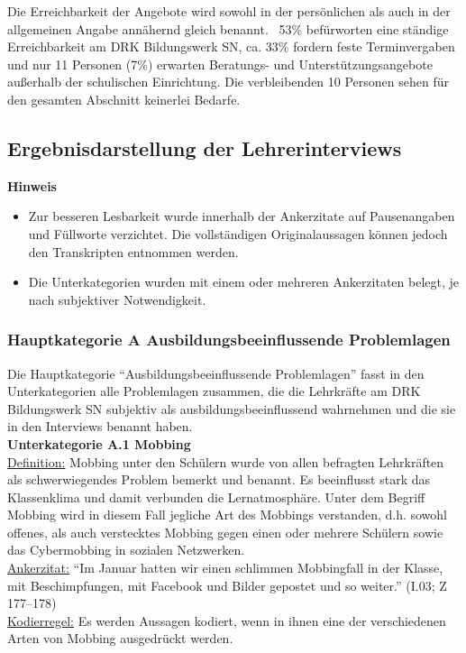 \noindent
Die Erreichbarkeit der Angebote wird sowohl in der persönlichen als auch in der allgemeinen Angabe annähernd gleich benannt. ~53\% befürworten eine ständige Erreichbarkeit am DRK Bildungswerk SN, ca. 33\% fordern feste Terminvergaben und nur 11 Personen (7\%) erwarten Beratungs- und Unterstützungsangebote außerhalb der schulischen Einrichtung. Die verbleibenden 10 Personen sehen für den gesamten Abschnitt keinerlei Bedarfe.

\newpage
\subsection{Ergebnisdarstellung der Lehrerinterviews}
\label{sec:ErgebnisdarstellungDerLehrerinterviews}

\textbf{Hinweis} 
\begin{itemize}
	\item Zur besseren Lesbarkeit wurde innerhalb der Ankerzitate auf Pausenangaben und Füllworte verzichtet. Die vollständigen Originalaussagen können jedoch den Transkripten entnommen werden.
	\item Die Unterkategorien wurden mit einem oder mehreren Ankerzitaten belegt, je nach subjektiver Notwendigkeit.
\end{itemize}

\subsubsection{Hauptkategorie A Ausbildungsbeeinflussende Problemlagen}
\label{sec:HauptkategorieAAusbildungsbeeinflussendeProblemlagen}

Die Hauptkategorie "`Ausbildungsbeeinflussende Problemlagen"' fasst in den Unterkategorien alle Problemlagen zusammen, die die Lehrkräfte am DRK Bildungswerk SN subjektiv als ausbildungsbeeinflussend wahrnehmen und die sie in den Interviews benannt haben.\\

\noindent
\textbf{Unterkategorie A.1 Mobbing}\\
\underline{Definition:} Mobbing unter den Schülern wurde von allen befragten Lehrkräften als schwerwiegendes Problem bemerkt und benannt. Es beeinflusst stark das Klassenklima und damit verbunden die Lernatmosphäre. Unter dem Begriff Mobbing wird in diesem Fall jegliche Art des Mobbings verstanden, d.h. sowohl offenes, als auch verstecktes Mobbing gegen einen oder mehrere Schülern sowie das Cybermobbing in sozialen Netzwerken.\\
\underline{Ankerzitat:} "`Im Januar hatten wir einen schlimmen Mobbingfall in der Klasse, mit Beschimpfungen, mit Facebook und Bilder gepostet und so weiter."' (I.03; Z 177--178)\\
\underline{Kodierregel:} Es werden Aussagen kodiert, wenn in ihnen eine der verschiedenen Arten von Mobbing ausgedrückt werden.\\

